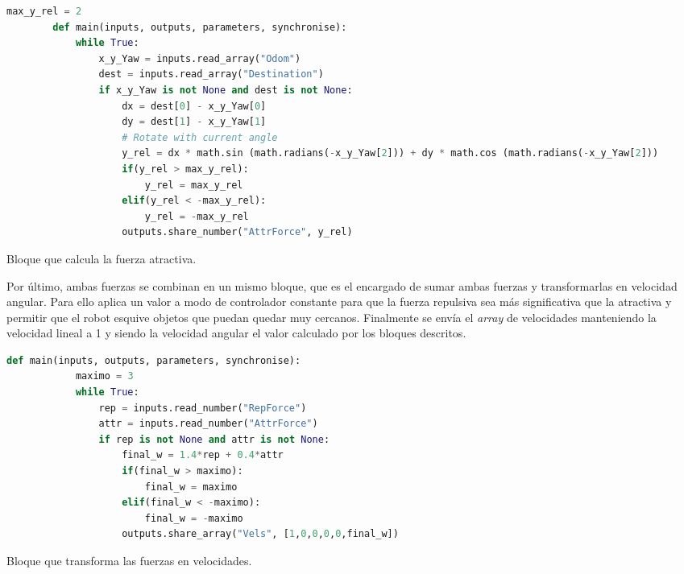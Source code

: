 \begin{code}[H]
    \begin{lstlisting}[language=python]
        max_y_rel = 2
        def main(inputs, outputs, parameters, synchronise):
            while True:
                x_y_Yaw = inputs.read_array("Odom")
                dest = inputs.read_array("Destination")
                if x_y_Yaw is not None and dest is not None:
                    dx = dest[0] - x_y_Yaw[0]
                    dy = dest[1] - x_y_Yaw[1]
                    # Rotate with current angle
                    y_rel = dx * math.sin (math.radians(-x_y_Yaw[2])) + dy * math.cos (math.radians(-x_y_Yaw[2]))
                    if(y_rel > max_y_rel):
                        y_rel = max_y_rel
                    elif(y_rel < -max_y_rel):
                        y_rel = -max_y_rel
                    outputs.share_number("AttrForce", y_rel)
    \end{lstlisting}
    \caption[Bloque fuerza atractiva]{Bloque que calcula la fuerza atractiva.}
    \label{cod:attr_vel}
\end{code}

Por último, ambas fuerzas se combinan en un mismo bloque, que es el encargado de sumar ambas fuerzas y transformarlas en velocidad angular. Para ello aplica
un valor a modo de controlador constante para que la fuerza repulsiva sea más significativa que la atractiva y permitir que el robot esquive objetos que
puedan quedar muy cercanos. Finalmente se envía el \textit{array} de velocidades manteniendo la velocidad lineal a 1 y siendo la velocidad angular el valor
calculado por los bloques descritos.

\begin{code}[H]
    \begin{lstlisting}[language=python]
        def main(inputs, outputs, parameters, synchronise):
            maximo = 3
            while True:            
                rep = inputs.read_number("RepForce")
                attr = inputs.read_number("AttrForce")
                if rep is not None and attr is not None:
                    final_w = 1.4*rep + 0.4*attr
                    if(final_w > maximo):
                        final_w = maximo
                    elif(final_w < -maximo):
                        final_w = -maximo
                    outputs.share_array("Vels", [1,0,0,0,0,final_w])
    \end{lstlisting}
    \caption[Bloque fuerzas a velocidades]{Bloque que transforma las fuerzas en velocidades.}
    \label{cod:VFF_force_to_vel}
\end{code}

